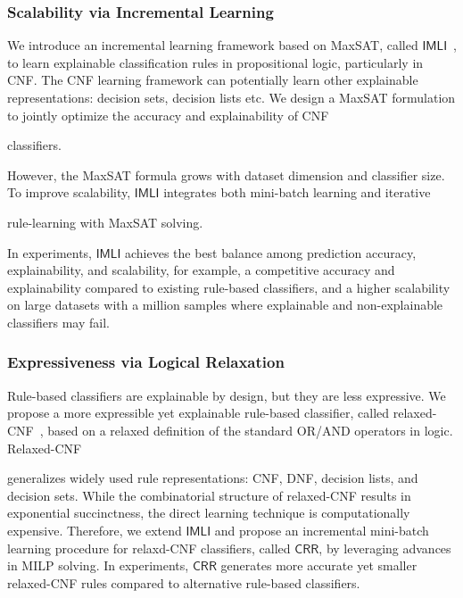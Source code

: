 \documentclass[10pt]{article}
\newif\iflongproposal
\begin{document}
	\subsubsection*{Scalability via Incremental Learning}
	We introduce an incremental learning framework based on MaxSAT, called $\mathsf{IMLI}$~\cite{ghosh22efficient,ghosh2019incremental}, to learn explainable classification rules in propositional logic, particularly in CNF. The CNF learning framework can potentially learn other explainable representations: decision sets, decision lists etc.
	We design a MaxSAT formulation to jointly optimize the accuracy and explainability of CNF 
	\iflongproposal
	classifiers, and leverage the progress in MaxSAT solving to efficiently learn an optimal classifier. 
	\else
	classifiers. 
	\fi 
	However, the MaxSAT formula grows with dataset dimension and classifier size. To improve scalability, $\mathsf{IMLI}$ integrates both mini-batch learning and iterative 
	\iflongproposal
	rule-learning: $\mathsf{IMLI}$ learns a CNF classifier by iteratively covering the training data, where in each iteration $\mathsf{IMLI}$ solves a sequence of smaller MaxSAT queries respective to mini-batches. 
	\else
	rule-learning with MaxSAT solving.
	\fi
	In experiments, $\mathsf{IMLI}$ achieves the best balance among prediction accuracy, explainability, and scalability, for example, a competitive accuracy and explainability compared to existing rule-based classifiers, and a higher scalability on large datasets with a million samples where  explainable and non-explainable classifiers may fail. 
	
	\subsubsection*{Expressiveness via Logical Relaxation}
	Rule-based classifiers are explainable by design, but they are less expressive. We propose a more expressible yet explainable rule-based classifier, called relaxed-CNF~\cite{ghosh2020classification}, based on a relaxed definition of the standard OR/AND operators in logic. \iflongproposal
	Motivated by checklists in the medical domain such as $ \text{CHADS}_2 $ score, in relaxed-CNF, both the minimum number of literals satisfied in a clause and the maximum number of clauses satisfied in a formula are flexible. As a result, relaxed-CNF
	\else
	Relaxed-CNF 
	\fi
	 generalizes widely used rule representations: CNF, DNF, decision lists, and decision sets. While the combinatorial structure of relaxed-CNF results in exponential succinctness, the direct learning technique is computationally expensive. Therefore, we extend $\mathsf{IMLI}$ and propose an incremental mini-batch learning procedure for relaxd-CNF classifiers, called $\mathsf{CRR}$, by leveraging advances in MILP solving. In experiments, $\mathsf{CRR}$ generates more accurate yet smaller relaxed-CNF rules compared to alternative rule-based classifiers.
	
\end{document}
